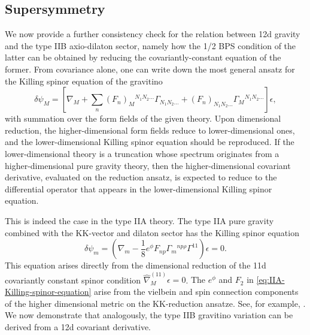 \subsection{Supersymmetry}
We now provide a further consistency check for the relation between 12d gravity and the type IIB axio-dilaton sector, namely how the 1/2 BPS condition of the latter can be obtained by reducing the covariantly-constant equation of the former.
From covariance alone, one can write down the most general ansatz for the Killing spinor equation of the gravitino
\begin{equation}
\delta\psi_M
= 
\left[
\nabla_M+\sum_n(F_{n})_M{}^{N_1N_2...}\Gamma_{N_1 N_2...} 
+ (F_{n})_{N_1N_2...}\Gamma_M{}^{N_1N_2...}
\right]\epsilon,
\end{equation}
with summation over the form fields of the given theory.
Upon dimensional reduction, the higher-dimensional form fields reduce to lower-dimensional ones, and the lower-dimensional Killing spinor equation should be reproduced.
If the lower-dimensional theory is a truncation whose spectrum originates from a higher-dimensional pure gravity theory, then the higher-dimensional covariant derivative, evaluated on the reduction ansatz, is expected to reduce to the differential operator that appears in the lower-dimensional Killing spinor equation.

This is indeed the case in the type IIA theory.
The type IIA pure gravity combined with the KK-vector and dilaton sector has the Killing spinor equation
\begin{equation}
\delta \psi_m =
\left(
\nabla_m - \frac{1}{8}e^\phi F_{np}\Gamma_m{}^{np\rho} \Gamma^{11}
\right)\epsilon = 0.
\label{eq:IIA-Killing-spinor-equation}
\end{equation}
This equation arises directly from the dimensional reduction of the 11d covariantly constant spinor condition $\hat{\nabla}^{(11)}_M\epsilon = 0$. 
{\color{orange}
The $e^\phi$ and $F_2$ in \eqref{eq:IIA-Killing-spinor-equation} arise from the vielbein and spin connection components of the higher dimensional metric on the KK-reduction ansatze.
}
See, for example, \cite{Becker:2006dvp}.
We now demonstrate that analogously, the type IIB gravitino variation can be derived from a 12d covariant derivative.

